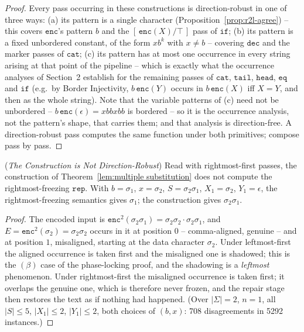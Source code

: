 \documentclass[runningheads,envcountsect]{llncs}
\begin{document}
\begin{proof}
    Every pass occurring in these constructions is direction-robust in one of three ways: (a) its pattern is a single character (Proposition~\ref{prop:r2l-agree}) -- this covers $\mathtt{enc}$'s pattern $b$ and the $[\,\mathtt{enc}(X)/\top\,]$ pass of $\mathtt{if}$; (b) its pattern is a fixed unbordered constant, of the form $xb^k$ with $x \neq b$ -- covering $\mathtt{dec}$ and the marker passes of $\mathtt{cat}$; (c) its pattern has at most one occurrence in every string arising at that point of the pipeline -- which is exactly what the occurrence analyses of Section~2 establish for the remaining passes of $\mathtt{cat}$, $\mathtt{tail}$, $\mathtt{head}$, $\mathtt{eq}$ and $\mathtt{if}$ (e.g.\ by Border Injectivity, $b\,\mathtt{enc}(Y)$ occurs in $b\,\mathtt{enc}(X)$ iff $X = Y$, and then as the whole string). Note that the variable patterns of (c) need not be unbordered -- $b\,\mathtt{enc}(\epsilon) = xbbxbb$ is bordered -- so it is the occurrence analysis, not the pattern's shape, that carries them; and that analysis is direction-free. A direction-robust pass computes the same function under both primitives; compose pass by pass.
\end{proof}

\begin{theorem}
    (\emph{The Construction is Not Direction-Robust})
    \label{thm:r2l-rep}
    Read with rightmost-first passes, the construction of Theorem~\ref{lem:multiple substitution} does not compute the rightmost-freezing $\mathtt{rep}$. With $b = \sigma_1$, $x = \sigma_2$, $S = \sigma_2\sigma_1$, $X_1 = \sigma_2$, $Y_1 = \epsilon$, the rightmost-freezing semantics gives $\sigma_1$; the construction gives $\sigma_2\sigma_1$.
\end{theorem}

\begin{proof}
    The encoded input is $\mathtt{enc}^2(\sigma_2\sigma_1) = \sigma_2\sigma_2\cdot\sigma_2\sigma_1$, and $E = \mathtt{enc}^2(\sigma_2) = \sigma_2\sigma_2$ occurs in it at position $0$ -- comma-aligned, genuine -- and at position $1$, misaligned, starting at the data character $\sigma_2$. Under leftmost-first the aligned occurrence is taken first and the misaligned one is shadowed; this is the $(\beta)$ case of the phase-locking proof, and the shadowing is a \emph{leftmost} phenomenon. Under rightmost-first the misaligned occurrence is taken first; it overlaps the genuine one, which is therefore never frozen, and the repair stage then restores the text as if nothing had happened. (Over $|\Sigma| = 2$, $n = 1$, all $|S| \leq 5$, $|X_1| \leq 2$, $|Y_1| \leq 2$, both choices of $(b,x)$: 708 disagreements in 5292 instances.)
\end{proof}
\end{document}
